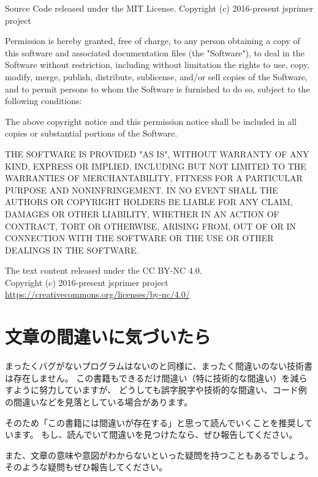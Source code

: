 Source Code released under the MIT License.
Copyright (c) 2016-present jsprimer project

Permission is hereby granted, free of charge, to any person obtaining a copy
of this software and associated documentation files (the "Software"), to deal
in the Software without restriction, including without limitation the rights
to use, copy, modify, merge, publish, distribute, sublicense, and/or sell
copies of the Software, and to permit persons to whom the Software is
furnished to do so, subject to the following conditions:

The above copyright notice and this permission notice shall be included in all
copies or substantial portions of the Software.

THE SOFTWARE IS PROVIDED "AS IS", WITHOUT WARRANTY OF ANY KIND, EXPRESS OR
IMPLIED, INCLUDING BUT NOT LIMITED TO THE WARRANTIES OF MERCHANTABILITY,
FITNESS FOR A PARTICULAR PURPOSE AND NONINFRINGEMENT. IN NO EVENT SHALL THE
AUTHORS OR COPYRIGHT HOLDERS BE LIABLE FOR ANY CLAIM, DAMAGES OR OTHER
LIABILITY, WHETHER IN AN ACTION OF CONTRACT, TORT OR OTHERWISE, ARISING FROM,
OUT OF OR IN CONNECTION WITH THE SOFTWARE OR THE USE OR OTHER DEALINGS IN THE
SOFTWARE.

\noindent\hrulefill\hspace*{65mm}

The text content released under the CC BY-NC 4.0.\\
Copyright (c) 2016-present jsprimer project\\
\url{https://creativecommons.org/licenses/by-nc/4.0/}

\hypertarget{how-to-report-mistake}{%
\section*{文章の間違いに気づいたら}\label{how-to-report-mistake}}

まったくバグがないプログラムはないのと同様に、まったく間違いのない技術書は存在しません。
この書籍もできるだけ間違い（特に技術的な間違い）を減らすように努力していますが、
どうしても誤字脱字や技術的な間違い、コード例の間違いなどを見落としている場合があります。

そのため「この書籍には間違いが存在する」と思って読んでいくことを推奨しています。
もし、読んでいて間違いを見つけたなら、ぜひ報告してください。

また、文章の意味や意図がわからないといった疑問を持つこともあるでしょう。
そのような疑問もぜひ報告してください。

